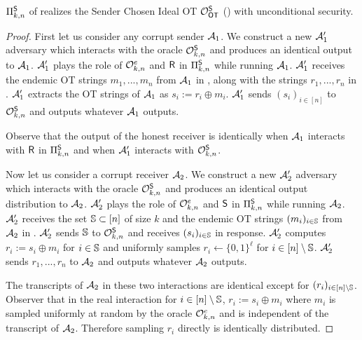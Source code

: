 \begin{lemma}
	$\Pi^{\mathsf{S}}_{k,n}$ of  realizes the Sender Chosen Ideal OT $\mathcal{O}_{\mathsf{OT}}^{\mathsf{S}}$ () with unconditional security.
\end{lemma}

\begin{proof}
	First let us consider any corrupt sender $\mathcal{A}_1$. We construct a new $\mathcal{A}_1'$ adversary which interacts with the oracle $\mathcal{O}^{\mathsf{S}}_{k,n}$ and produces an identical output  to $\mathcal{A}_1$.  $\mathcal{A}_1'$ plays the role of $\mathcal{O}^{e}_{k,n}$ and $\mathsf{R}$ in $\Pi^{\mathsf{S}}_{k,n}$ while running $\mathcal{A}_1$. $\mathcal{A}_1'$ receives the endemic OT strings $m_1,...,m_n$ from $\mathcal{A}_1$ in , along with the strings $r_1,...,r_n$ in .  $\mathcal{A}_1'$ extracts the OT strings of $\mathcal{A}_1$ as $s_i:=r_i\oplus m_i$. $\mathcal{A}_1'$ sends $(s_i)_{i\in [n]}$ to $\mathcal{O}^{\mathsf{S}}_{k,n}$ and outputs whatever $\mathcal{A}_1$ outputs.
	
	Observe that the output of the honest receiver is identically when $\mathcal{A}_1$ interacts with $\mathsf{R}$ in $\Pi^{\mathsf{S}}_{k,n}$ and when $\mathcal{A}_1'$ interacts with $\mathcal{O}^{\mathsf{S}}_{k,n}$.
	
	
	Now let us consider a corrupt receiver $\mathcal{A}_2$. We construct a new $\mathcal{A}_2'$ adversary which interacts with the oracle $\mathcal{O}^{\mathsf{S}}_{k,n}$ and produces an identical output distribution to $\mathcal{A}_2$. $\mathcal{A}_2'$ plays the role of $\mathcal{O}^{e}_{k,n}$ and $\mathsf{S}$ in $\Pi^{\mathsf{S}}_{k,n}$ while running $\mathcal{A}_2$. $\mathcal{A}_2'$ receives the set $\mathsf{\mathbb S}\subset[n]$ of size $k$ and the endemic OT strings $(m_i)_{i\in \mathsf{\mathbb S}}$ from $\mathcal{A}_2$ in . $\mathcal{A}_2'$ sends $\mathsf{\mathbb S}$ to  $\mathcal{O}^{\mathsf{S}}_{k,n}$ and receives $(s_i)_{i\in \mathsf{\mathbb S}}$ in response. $\mathcal{A}_2'$ computes $r_i:=s_i\oplus m_i$ for $i\in \mathsf{\mathbb S}$ and uniformly samples $r_i\gets \{0,1\}^\ell$ for $i\in [n]\setminus \mathsf{\mathbb S}$. $\mathcal{A}_2'$ sends $r_1,...,r_n$ to $\mathcal{A}_2$ and outputs whatever $\mathcal{A}_2$ outputs.

	The transcripts of $\mathcal{A}_2$ in these two interactions are identical except for $(r_i)_{i\in [n]\setminus \mathsf{\mathbb S}}$. Observer that in the real interaction for $i\in [n]\setminus\mathsf{\mathbb S}$, $r_i:=s_i\oplus m_i$ where $m_i$ is sampled uniformly at random  by the oracle $\mathcal{O}^{e}_{k,n}$ and is independent of the transcript of $\mathcal{A}_2$. Therefore sampling $r_i$ directly is identically distributed. 
\end{proof}
